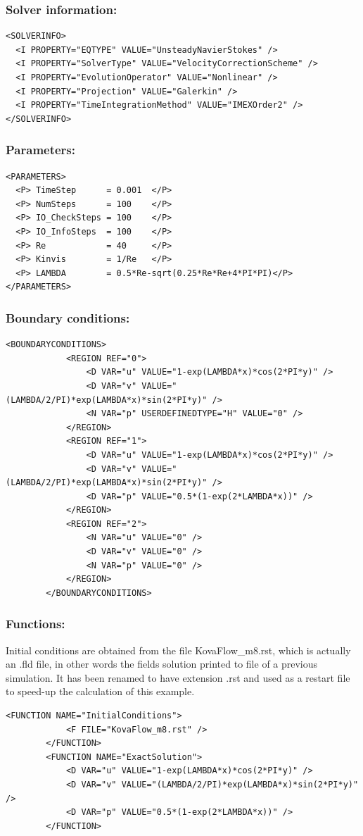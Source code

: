 \subsubsection{Solver information:~}
\begin{lstlisting}[style=XMLStyle]
<SOLVERINFO>
  <I PROPERTY="EQTYPE" VALUE="UnsteadyNavierStokes" />
  <I PROPERTY="SolverType" VALUE="VelocityCorrectionScheme" />
  <I PROPERTY="EvolutionOperator" VALUE="Nonlinear" />
  <I PROPERTY="Projection" VALUE="Galerkin" />
  <I PROPERTY="TimeIntegrationMethod" VALUE="IMEXOrder2" />
</SOLVERINFO>
\end{lstlisting}

\subsubsection{Parameters:~}
\begin{lstlisting}[style=XMLStyle]
<PARAMETERS>
  <P> TimeStep      = 0.001  </P>
  <P> NumSteps      = 100    </P>
  <P> IO_CheckSteps = 100    </P>
  <P> IO_InfoSteps  = 100    </P>
  <P> Re            = 40     </P>
  <P> Kinvis        = 1/Re   </P>
  <P> LAMBDA        = 0.5*Re-sqrt(0.25*Re*Re+4*PI*PI)</P>
</PARAMETERS>
\end{lstlisting}

\subsubsection{Boundary conditions:~}
\begin{lstlisting}[style=XMLStyle]
  		<BOUNDARYCONDITIONS>
    		<REGION REF="0">
      			<D VAR="u" VALUE="1-exp(LAMBDA*x)*cos(2*PI*y)" />
      			<D VAR="v" VALUE="(LAMBDA/2/PI)*exp(LAMBDA*x)*sin(2*PI*y)" />
      			<N VAR="p" USERDEFINEDTYPE="H" VALUE="0" />
    		</REGION>
    		<REGION REF="1">
      			<D VAR="u" VALUE="1-exp(LAMBDA*x)*cos(2*PI*y)" />
      			<D VAR="v" VALUE="(LAMBDA/2/PI)*exp(LAMBDA*x)*sin(2*PI*y)" />
      			<D VAR="p" VALUE="0.5*(1-exp(2*LAMBDA*x))" />
    		</REGION>
    		<REGION REF="2">
      			<N VAR="u" VALUE="0" />
      			<D VAR="v" VALUE="0" />
      			<N VAR="p" VALUE="0" />
    		</REGION>
  		</BOUNDARYCONDITIONS>
\end{lstlisting}

\subsubsection{Functions:~} Initial conditions are obtained from the file KovaFlow\_m8.rst, which is actually an .fld file, in other words the fields solution printed to file of a previous simulation. It has been renamed to have extension .rst and used as a restart file to speed-up the calculation of this example.
\begin{lstlisting}[style=XMLStyle]
  		<FUNCTION NAME="InitialConditions">
    		<F FILE="KovaFlow_m8.rst" />
  		</FUNCTION>
  		<FUNCTION NAME="ExactSolution">
     		<D VAR="u" VALUE="1-exp(LAMBDA*x)*cos(2*PI*y)" />
     		<D VAR="v" VALUE="(LAMBDA/2/PI)*exp(LAMBDA*x)*sin(2*PI*y)" />
     		<D VAR="p" VALUE="0.5*(1-exp(2*LAMBDA*x))" />
  		</FUNCTION>
\end{lstlisting}


